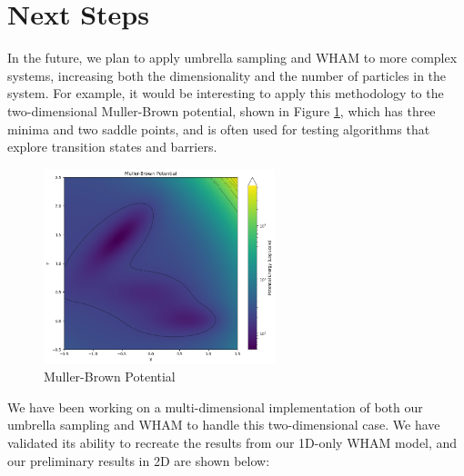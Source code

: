 \documentclass{article}
\begin{document}
\section{Next Steps}

In the future, we plan to apply umbrella sampling and WHAM to more complex systems, increasing both the dimensionality and the number of particles in the system. For example, it would be interesting to apply this methodology to the two-dimensional Muller-Brown potential, shown in Figure \ref{fig:2D_pot}, which has three minima and two saddle points, and is often used for testing algorithms that explore transition states and barriers. 

\begin{figure}[h]%
    \centering
    \includegraphics[width=0.6\textwidth]{images/muller_brown_V.png}
    \caption{Muller-Brown Potential}%
    \label{fig:2D_pot}%
\end{figure}

We have been working on a multi-dimensional implementation of both our umbrella sampling and WHAM to handle this two-dimensional case. We have validated its ability to recreate the results from our 1D-only WHAM model, and our preliminary results in 2D are shown below:
\end{document}
